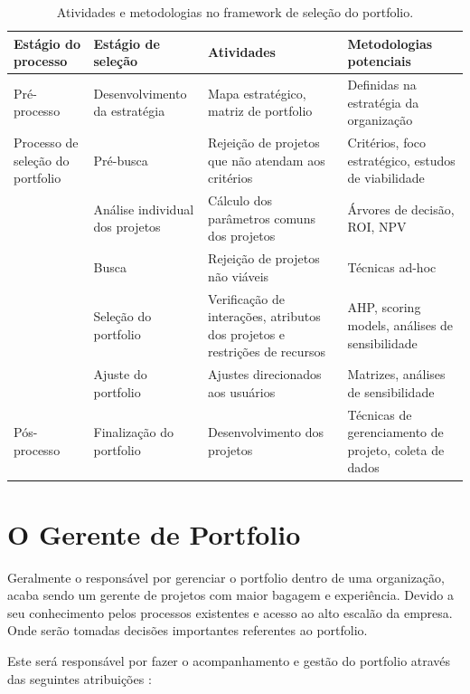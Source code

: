 \documentclass[12pt,a4paper,ruledheader,tocpage=prefix,floatnumber=continuous,pagestart=folhaderosto,font=times]{abnt}
\begin{document}
\begin{table}[H]
\begin{center}
 \begin{tabular}{| >{\centering\arraybackslash\small}m{1.4in} | >{\centering\arraybackslash\small}m{1.3in} | >{\centering\arraybackslash\small}m{1.5in} | >{\centering\arraybackslash\small}m{1in} |}
  \hline
  \rowcolor{purple} Estágio do processo & Estágio de seleção & Atividades & Metodologias potenciais \\
  \hline
   Pré-processo & Desenvolvimento da estratégia & Mapa estratégico, matriz de portfolio & Definidas na estratégia da organização \\
  \hline
  Processo de seleção do portfolio & Pré-busca & Rejeição de projetos que não atendam aos critérios & Critérios, foco estratégico, estudos de viabilidade \\
  \cline{2-4} 
	  & Análise individual dos projetos & Cálculo dos parâmetros comuns dos projetos  & Árvores de decisão, ROI, NPV \\
  \cline{2-4} 
	  & Busca & Rejeição de projetos não viáveis & Técnicas ad-hoc \\
  \cline{2-4} 
         & Seleção do portfolio & Verificação de interações, atributos dos projetos e restrições de recursos & AHP, scoring models, análises de sensibilidade \\
  \cline{2-4} 
	& Ajuste do portfolio & Ajustes direcionados aos usuários & Matrizes, análises de sensibilidade\\
  \hline
  Pós-processo & Finalização do portfolio & Desenvolvimento dos projetos & Técnicas de gerenciamento de projeto, coleta de dados \\
  \hline
 \end{tabular}
\caption{Atividades e metodologias no framework de seleção do portfolio\cite{ARCHER1999}.}
\end{center}
\end{table}

\section{O Gerente de Portfolio}
Geralmente o responsável por gerenciar o portfolio dentro de uma organização, acaba sendo um gerente de projetos com maior bagagem e experiência. Devido a
seu conhecimento pelos processos existentes e acesso ao alto escalão da empresa. Onde serão tomadas decisões importantes referentes ao portfolio.

Este será responsável por fazer o acompanhamento e gestão do portfolio através das seguintes atribuições \cite{SPPM2008}:
\end{document}
